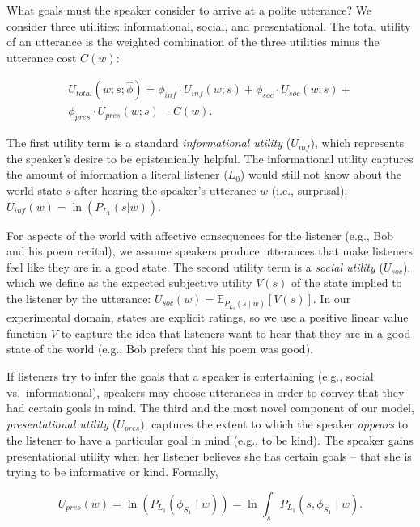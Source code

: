 \documentclass[9pt,twocolumn,twoside,lineno]{main_class_file}
\begin{document}
What goals must the speaker consider to arrive at a polite utterance? We
consider three utilities: informational, social, and presentational. The
total utility of an utterance is the weighted combination of the three
utilities minus the utterance cost \(C(w)\):

\begin{equation}
\begin{split}
U_{total}(w; s; \hat{\phi}) = \phi_{inf} \cdot U_{inf}(w; s) + \phi_{soc} \cdot U_{soc}(w; s) + \\ \phi_{pres} \cdot U_{pres}(w; s) - C(w). 
\end{split}
\end{equation}

\par
The first utility term is a standard \emph{informational utility}
(\(U_{inf}\)), which represents the speaker's desire to be epistemically
helpful. The informational utility captures the amount of information a
literal listener (\(L_0\)) would still not know about the world state
\(s\) after hearing the speaker's utterance \(w\) (i.e., surprisal):
\(U_{inf}(w) = \ln(P_{L_1}(s | w))\).

For aspects of the world with affective consequences for the listener
(e.g., Bob and his poem recital), we assume speakers produce utterances
that make listeners feel like they are in a good state. The second
utility term is a \emph{social utility} (\(U_{soc}\)), which we define
as the expected subjective utility \(V(s)\) of the state implied to the
listener by the utterance:
\(U_{soc}(w) = \mathbb{E}_{P_{L_1}(s \mid w)}[V(s)]\). In our
experimental domain, states are explicit ratings, so we use a positive
linear value function \(V\) to capture the idea that listeners want to
hear that they are in a good state of the world (e.g., Bob prefers that
his poem was good).

If listeners try to infer the goals that a speaker is entertaining
(e.g., social vs.~informational), speakers may choose utterances in
order to convey that they had certain goals in mind. The third and the
most novel component of our model, \emph{presentational utility}
(\(U_{pres}\)), captures the extent to which the speaker \emph{appears}
to the listener to have a particular goal in mind (e.g., to be kind).
The speaker gains presentational utility when her listener believes she
has certain goals -- that she is trying to be informative or kind.
Formally,

\begin{equation}
U_{pres}(w) = \ln(P_{L_1}(\phi_{S_1} \mid w)) = \ln \int_s P_{L_1}(s, \phi_{S_1} \mid w).
\end{equation}
\end{document}
